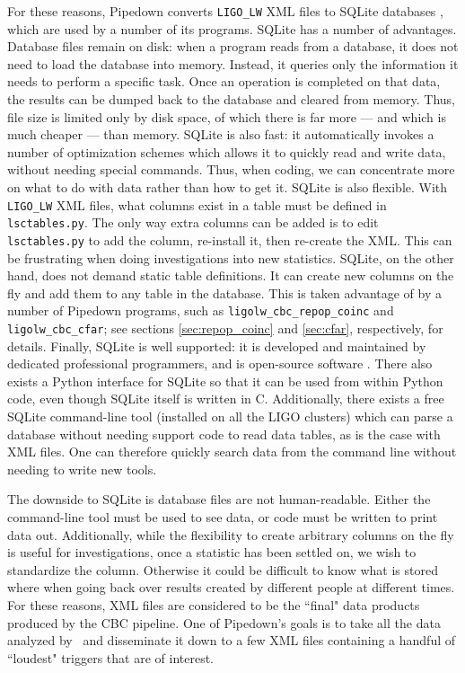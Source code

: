 For these reasons, Pipedown converts \verb|LIGO_LW| XML files to SQLite
databases \cite{sqlite}, which are used by a number of its programs. SQLite has
a number of advantages. Database files remain on disk: when a program reads
from a database, it does not need to load the database into memory. Instead, it
queries only the information it needs to perform a specific task. Once an
operation is completed on that data, the results can be dumped back to the
database and cleared from memory. Thus, file size is limited only by disk
space, of which there is far more --- and which is much cheaper --- than
memory. SQLite is also fast: it automatically invokes a number of optimization
schemes which allows it to quickly read and write data, without needing special
commands. Thus, when coding, we can concentrate more on what to do with data
rather than how to get it. SQLite is also flexible. With \verb|LIGO_LW| XML
files, what columns exist in a table must be defined in \verb|lsctables.py|.
The only way extra columns can be added is to edit \verb|lsctables.py| to add
the column, re-install it, then re-create the XML. This can be frustrating when
doing investigations into new statistics. SQLite, on the other hand, does not
demand static table definitions. It can create new columns on the fly and add
them to any table in the database. This is taken advantage of by a number of
Pipedown programs, such as \verb|ligolw_cbc_repop_coinc| and
\verb|ligolw_cbc_cfar|; see sections \ref{sec:repop_coinc} and \ref{sec:cfar},
respectively, for details. Finally, SQLite is well supported: it is developed
and maintained by dedicated professional programmers, and is open-source
software \cite{sqlite}. There also exists a Python interface for SQLite so that
it can be used from within Python code, even though SQLite itself is written in
C.  Additionally, there exists a free SQLite command-line tool (installed on
all the \ac{LIGO} clusters) which can parse a database without needing support
code to read data tables, as is the case with XML files. One can therefore
quickly search data from the command line without needing to write new tools.

The downside to SQLite is database files are not human-readable. Either the
command-line tool must be used to see data, or code must be written to print
data out. Additionally, while the flexibility to create arbitrary columns on
the fly is useful for investigations, once a statistic has been settled on, we
wish to standardize the column. Otherwise it could be difficult to know what is
stored where when going back over results created by different people at
different times. For these reasons, XML files are considered to be the ``final"
data products produced by the \ac{CBC} pipeline. One of Pipedown's goals is to
take all the data analyzed by \ihope~and disseminate it down to a few XML files
containing a handful of ``loudest" triggers that are of interest.

